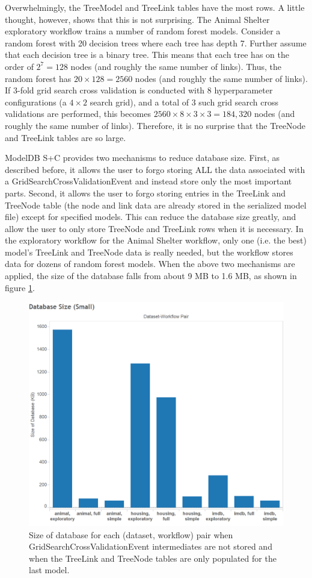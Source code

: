 Overwhelmingly, the TreeModel and TreeLink tables have the most rows. A little
thought, however, shows that this is not surprising. The Animal Shelter exploratory workflow
trains a number of random forest models. Consider
a random forest with 20 decision trees where each tree has depth 7. Further assume
that each decision tree is a binary tree. This means that each tree has on the
order of $2^{7} = 128$ nodes (and roughly the same number of links). Thus, the
random forest has $20 \times 128 = 2560$ nodes (and roughly the same number of links).
If 3-fold grid search cross validation is conducted with 8 hyperparameter configurations (a $4 \times 2$ 
search grid), and a total of 3 such grid search cross validations are performed, 
this becomes $2560 \times 8 \times 3 \times 3 = 184,320$ nodes (and roughly the same number of links).
Therefore, it is no surprise that the TreeNode and TreeLink tables are so large.

ModelDB S+C provides two mechanisms to reduce database size. First, as described before, it
allows the user to forgo storing ALL the data associated with a GridSearchCrossValidationEvent and instead
store only the most important parts.
Second, it allows the user to forgo storing entries in the TreeLink and TreeNode table (the
node and link data are already stored in the serialized model file) except for specified models. This can reduce the database size
greatly, and allow the user to only store TreeNode and TreeLink rows when it is necessary. In the 
exploratory workflow for the Animal Shelter workflow, only one (i.e. the best)  model's TreeLink and TreeNode data is really needed,
but the workflow stores data for dozens of random forest models. When the above two mechanisms are applied,
the size of the database falls from about 9 MB to 1.6 MB, as shown in figure \ref{fig:dbsize_small}.

\begin{figure}
  \centering
  \includegraphics[width=5.0in]{dbsize_small}
  \caption{
    Size of database for each (dataset, workflow) pair when GridSearchCrossValidationEvent intermediates
    are not stored and when the TreeLink and TreeNode tables are only populated for the last model.
  }
  \label{fig:dbsize_small}
\end{figure}


